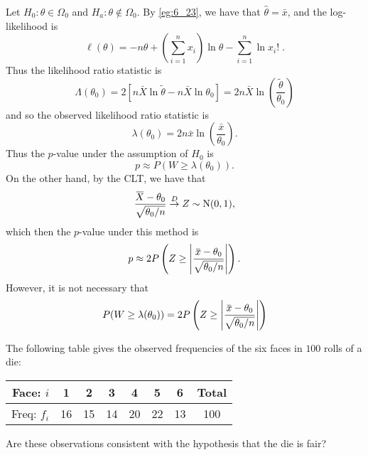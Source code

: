 \documentclass[notoc,notitlepage]{tufte-book}
\newcommand{\convd}{\overset{D}{\to}}
\begin{document}
\begin{solution}
  Let $H_0 : \theta \in \Omega_0$ and $H_a : \theta \notin \Omega_0$. By \cref{eg:6_23}, we have that $\hat{\theta} = \bar{x}$, and the log-likelihood is
  \begin{equation*}
    \ell(\theta) = -n\theta + \left( \sum_{i=1}^{n} x_i \right) \ln \theta - \sum_{i=1}^{n} \ln x_i! \; .
  \end{equation*}
  Thus the likelihood ratio statistic is
  \begin{equation*}
    \Lambda(\theta_0) = 2[ n\bar{X} \ln \tilde{\theta} - n \bar{X} \ln \theta_0 ] = 2n\bar{X} \ln \left( \frac{\tilde{\theta}}{\theta_0} \right)
  \end{equation*}
  and so the observed likelihood ratio statistic is
  \begin{equation*}
    \lambda(\theta_0) = 2n \bar{x} \ln \left( \frac{\bar{x}}{\theta_0} \right).
  \end{equation*}
  Thus the $p$-value under the assumption of $H_0$ is
  \begin{equation*}
    p \approx P(W \geq \lambda(\theta_0)).
  \end{equation*}
  On the other hand, by the CLT, we have that
  \begin{equation*}
    \frac{\bar{X} - \theta_0}{\sqrt{ \theta_0 / n }} \convd Z \sim \Nor(0, 1), \end{equation*}
  which then the $p$-value under this method is
  \begin{equation*}
    p \approx 2 P\left(Z \geq \abs{\frac{\bar{x} - \theta_0}{\sqrt{\theta_0 / n}}}\right).
  \end{equation*}
  However, it is not necessary that
  \begin{equation*}
    P(W \geq \lambda(\theta_0)) = 2 P\left(Z \geq \abs{\frac{\bar{x} - \theta_0}{\sqrt{\theta_0 / n}}}\right)
  \end{equation*}
\end{solution}

\begin{eg}
  The following table gives the observed frequencies of the six faces in $100$ rolls of a die:

  \begin{center}
  \begin{tabular}{r | c | c | c | c | c | c | c}
  Face: $i$   & 1  & 2  & 3  & 4  & 5  & 6  & Total \\
  \hline
  Freq: $f_i$ & 16 & 15 & 14 & 20 & 22 & 13 & 100
  \end{tabular}
  \end{center}

  Are these observations consistent with the hypothesis that the die is fair?
\end{eg}
\end{document}
